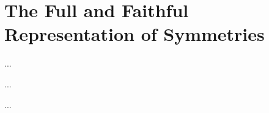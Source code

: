 \section{The Full and Faithful Representation of Symmetries}
\label{sec:The Full and Faithful Representation of Symmetries}

\begin{article}
  \label{art:lift-symmetries}
  ...
\end{article}

\begin{article}
  \label{art:automorphism-isomorphism}
  ...
\end{article}

\begin{article}
  \label{art:no-central-extensions}
  ...
\end{article}
